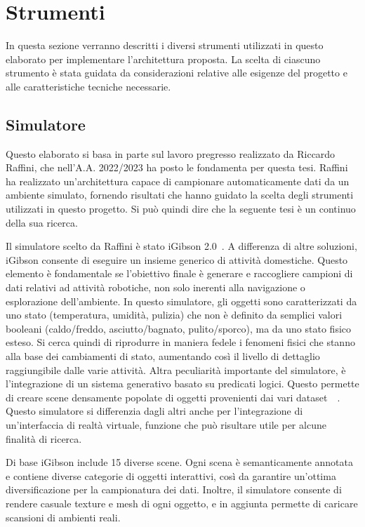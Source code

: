 \documentclass[12pt]{report}
\begin{document}
\section{Strumenti}
\label{sec:strumenti}

In questa sezione verranno descritti i diversi strumenti utilizzati in questo elaborato per implementare l'architettura proposta. La scelta di ciascuno strumento è stata guidata da considerazioni relative alle esigenze del progetto e alle caratteristiche tecniche necessarie.

\subsection{Simulatore}
\label{sec:simulatore}

Questo elaborato si basa in parte sul lavoro pregresso realizzato da Riccardo Raffini, che nell'A.A. 2022/2023 ha posto le fondamenta per questa tesi. Raffini ha realizzato un'architettura capace di campionare automaticamente dati da un ambiente simulato, fornendo risultati che hanno guidato la scelta degli strumenti utilizzati in questo progetto. Si può quindi dire che la seguente tesi è un continuo della sua ricerca.

Il simulatore scelto da Raffini è stato iGibson 2.0~\cite{li2021igibson}. A differenza di altre soluzioni, iGibson consente di eseguire un insieme generico di attività domestiche. Questo elemento è fondamentale se l'obiettivo finale è generare e raccogliere campioni di dati relativi ad attività robotiche, non solo inerenti alla navigazione o esplorazione dell'ambiente. In questo simulatore, gli oggetti sono caratterizzati da uno stato (temperatura, umidità, pulizia) che non è definito da semplici valori booleani (caldo/freddo, asciutto/bagnato, pulito/sporco), ma da uno stato fisico esteso. Si cerca quindi di riprodurre in maniera fedele i fenomeni fisici che stanno alla base dei cambiamenti di stato, aumentando così il livello di dettaglio raggiungibile dalle varie attività. Altra peculiarità importante del simulatore, è l'integrazione di un sistema generativo basato su predicati logici. Questo permette di creare scene densamente popolate di oggetti provenienti dai vari dataset~\cite{doi:10.1177/0278364919844314}~\cite{pmlr-v164-srivastava22a}. Questo simulatore si differenzia dagli altri anche per l'integrazione di un'interfaccia di realtà virtuale, funzione che può risultare utile per alcune finalità di ricerca.

Di base iGibson include 15 diverse scene. Ogni scena è semanticamente annotata e contiene diverse categorie di oggetti interattivi, così da garantire un'ottima diversificazione per la campionatura dei dati. Inoltre, il simulatore consente di rendere casuale texture e mesh di ogni oggetto, e in aggiunta permette di caricare scansioni di ambienti reali.
\end{document}
